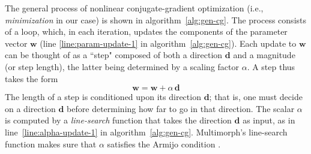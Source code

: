 The general process of nonlinear conjugate-gradient optimization 
(i.e., \emph{minimization} in our case)
is shown in algorithm~\ref{alg:gen-cg}. The process consists of a loop, 
which, in each iteration, updates the components of the parameter 
vector $\textbf{w}$ (line \ref{line:param-update-1} in algorithm~\ref{alg:gen-cg}).
Each update to $\textbf{w}$ can be thought of 
as a ``step" composed of both a direction $\textbf{d}$ and a magnitude (or step length), 
the latter being determined by a scaling factor $\alpha$. A step thus takes the form
\begin{equation}\label{eq:gen-update}
\textbf{w} = \textbf{w} + \alpha \, \textbf{d}
\end{equation}
The length of a step is conditioned upon its direction $\textbf{d}$; 
that is, one must decide on a direction $\textbf{d}$ before 
determining how far to go in that direction.
The scalar $\alpha$ is computed by a \emph{line-search} function 
that takes the direction $\textbf{d}$
as input, as in line~\ref{line:alpha-update-1} in algorithm~\ref{alg:gen-cg}.
Multimorph's line-search function makes sure that $\alpha$ satisfies the
Armijo condition \citep{armijo:1966}. %

